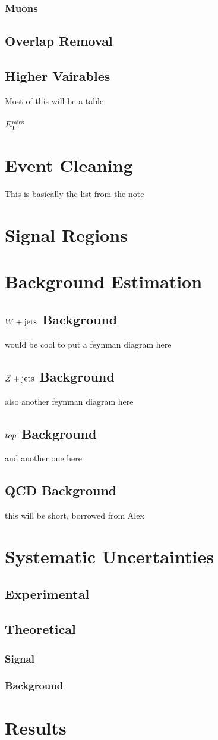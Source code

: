 \subsubsection{Muons}
\subsection{Overlap Removal}
\subsection{Higher Vairables}
Most of this will be a table
\subsubsection{$E_{\rm T}^{\rm miss}$}

\section{Event Cleaning}
This is basically the list from the note

\section{Signal Regions}

\section{Background Estimation}
\subsection{$W + \text{jets}$ Background}
would be cool to put a feynman diagram here
\subsection{$Z + \text{jets}$ Background}
also another feynman diagram here
\subsection{$top$ Background}
and another one here
\subsection{QCD Background}
this will be short, borrowed from Alex

\section{Systematic Uncertainties}
\subsection{Experimental}
\subsection{Theoretical}
\subsubsection{Signal}
\subsubsection{Background}

\section{Results}

